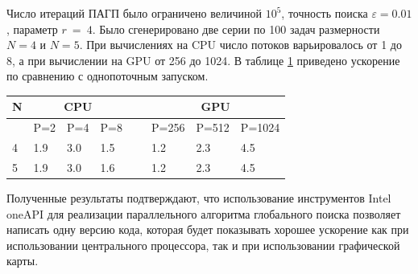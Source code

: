 \documentclass[10pt,a4paper]{book}
\begin{document}
Число итераций ПАГП было ограничено величиной $10^5$, точность поиска $\varepsilon=0.01$, параметр $r\ =\ 4$. Было сгенерировано две серии по 100 задач размерности $N = 4$ и $N = 5$. При вычислениях на CPU число потоков варьировалось от 1 до 8, а при вычислении на GPU от 256 до 1024. В таблице \ref{table3} приведено ускорение по сравнению с однопоточным запуском.

\begin{table}[!ht]
    \centering
    \label{table3}
    \begin{tabular}{|l|l|l|l|l|l|l|l|}
    \hline
        N &\multicolumn{3}{c|}{CPU} & ~ & \multicolumn{3}{c|}{GPU} \\ \hline
        ~ & P=2 & P=4 & P=8 & ~ & P=256 & P=512 & P=1024  \\ \hline
        4 & 1.9 & 3.0 & 1.5 & ~ & 1.2 & 2.3 & 4.5  \\ \hline
        5 & 1.9 & 3.0 & 1.6 & ~ & 1.2 & 2.3 & 4.5  \\ \hline
    \end{tabular}
\end{table}

Полученные результаты подтверждают, что использование инструментов Intel oneAPI для реализации параллельного алгоритма глобального поиска позволяет написать одну версию кода, которая будет показывать хорошее ускорение как при использовании центрального процессора, так и при использовании графической карты. 



%
%


\LITERRUS


\end{document}
